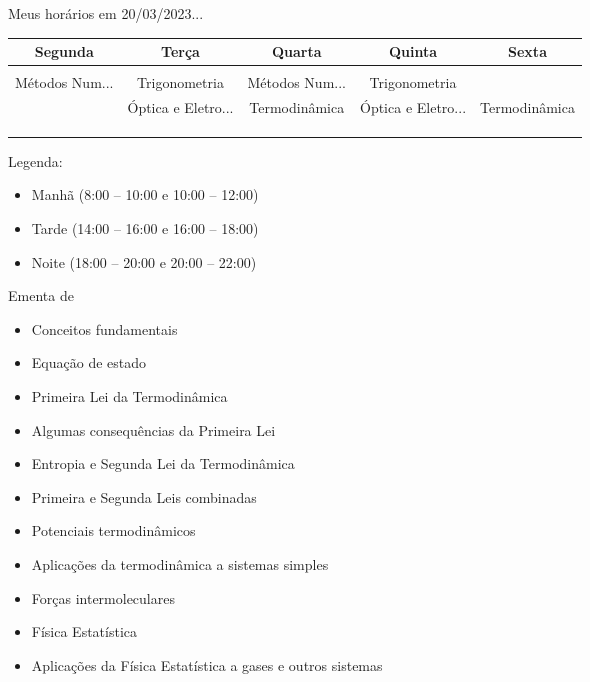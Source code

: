 \begin{frame}{Meus horários em 20/03/2023...}
    \small{
        \begin{center}
            \begin{tabular}{ccccc}
                \rowcolor{black!10} Segunda & Terça & Quarta & Quinta & Sexta \\ \hline
                \rowcolor{red!25} &&&& \\ \hline
                \rowcolor{red!25} Métodos Num... & Trigonometria & Métodos Num... & Trigonometria & \\ \hline
                \rowcolor{green!25} & Óptica e Eletro... & Termodinâmica & Óptica e Eletro... & Termodinâmica \\ \hline
                \rowcolor{green!25} &&&& \\ \hline
                \rowcolor{blue!25} &&&& \\ \hline
                \rowcolor{blue!25} &&&& \\ \hline
            \end{tabular}
        \end{center}

        \vspace{1cm}
        Legenda:
        \begin{itemize}
            \item[\textcolor{red!25}{\rule{1em}{1em}}] Manhã (8:00 -- 10:00 e 10:00 -- 12:00)
            \item[\textcolor{green!25}{\rule{1em}{1em}}] Tarde (14:00 -- 16:00 e 16:00 -- 18:00)
            \item[\textcolor{blue!25}{\rule{1em}{1em}}] Noite (18:00 -- 20:00 e 20:00 -- 22:00)
        \end{itemize}
    }
\end{frame}

\begin{frame}{Ementa de \Disciplina}
    \begin{itemize}
        \item Conceitos fundamentais
        \item Equação de estado
        \item Primeira Lei da Termodinâmica
        \item Algumas consequências da Primeira Lei
        \item Entropia e Segunda Lei da Termodinâmica
        \item Primeira e Segunda Leis combinadas
        \item Potenciais termodinâmicos
        \item Aplicações da termodinâmica a sistemas simples
        \item Forças intermoleculares
        \item Física Estatística
        \item Aplicações da Física Estatística a gases e outros sistemas
    \end{itemize}
\end{frame}

